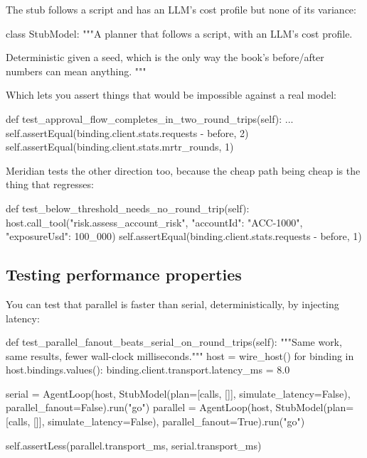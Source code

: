 The stub follows a script and has an LLM's cost profile but none of its
variance:

\begin{py}
class StubModel:
    """A planner that follows a script, with an LLM's cost profile.

    Deterministic given a seed, which is the only way the book's before/after
    numbers can mean anything.
    """
\end{py}

Which lets you assert things that would be impossible against a real model:

\begin{py}
def test_approval_flow_completes_in_two_round_trips(self):
    ...
    self.assertEqual(binding.client.stats.requests - before, 2)
    self.assertEqual(binding.client.stats.mrtr_rounds, 1)
\end{py}


Meridian tests the other direction too, because the cheap path being cheap is the
thing that regresses:

\begin{py}
def test_below_threshold_needs_no_round_trip(self):
    host.call_tool("risk.assess_account_risk",
                   {"accountId": "ACC-1000", "exposureUsd": 100_000})
    self.assertEqual(binding.client.stats.requests - before, 1)
\end{py}

\subsection{Testing performance properties}

You can test that parallel is faster than serial, deterministically, by injecting
latency:

\begin{py}
def test_parallel_fanout_beats_serial_on_round_trips(self):
    """Same work, same results, fewer wall-clock milliseconds."""
    host = wire_host()
    for binding in host.bindings.values():
        binding.client.transport.latency_ms = 8.0

    serial = AgentLoop(host, StubModel(plan=[calls, []],
                                       simulate_latency=False),
                       parallel_fanout=False).run("go")
    parallel = AgentLoop(host, StubModel(plan=[calls, []],
                                         simulate_latency=False),
                         parallel_fanout=True).run("go")

    self.assertLess(parallel.transport_ms, serial.transport_ms)
\end{py}

